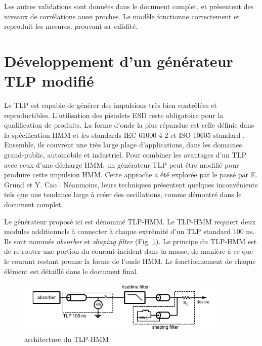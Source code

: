 Les autres validations sont données dans le document complet, et présentent des niveaux de corrélations aussi proches.
Le modèle fonctionne correctement et reproduit les mesures, prouvant sa validité.

\section{Développement d'un générateur TLP modifié}

Le TLP est capable de générer des impulsions très bien contrôlées et reproductibles.
L'utilisation des pistolets ESD reste obligatoire pour la qualification de produits.
La forme d'onde la plus répandue est celle définie dans la spécification HMM \cite{hmm} et les standards IEC 61000-4-2 \cite{iec61000-4-2} et ISO 10605 standard \cite{iso10605}.
Ensemble, ils couvrent une très large plage d'applications, dans les domaines grand-public, automobile et industriel.
Pour combiner les avantages d'un TLP avec ceux d'une décharge HMM, un générateur TLP peut être modifié pour produire cette impulsion HMM.
Cette approche a été explorée par le passé par E. Grund \cite{iec61000-tlp} et Y. Cao \cite{tlp-based-hmm}.
Néanmoins, leurs techniques présentent quelques inconvénients tels que une tendance large à créer des oscillations, comme démontré dans le document complet.

Le générateur proposé ici est dénommé TLP-HMM.
Le TLP-HMM requiert deux modules additionnels à connecter à chaque extrémité d'un TLP standard 100 ns.
Ils sont nommés \textit{absorber} et \textit{shaping filter} (Fig. \ref{fig:tlp_hmm_architecture}).
Le principe du TLP-HMM est de re-router une portion du courant incident dans la masse, de manière à ce que le courant restant prenne la forme de l'onde HMM.
Le fonctionnement de chaque élément est détaillé dans le document final.

\begin{figure}[!h]
  \centering
  \includegraphics[width=0.9\textwidth]{src/1/figures/beges_tlp_hmm.pdf}
  \caption{architecture du TLP-HMM}
  \label{fig:tlp_hmm_architecture}
\end{figure}

